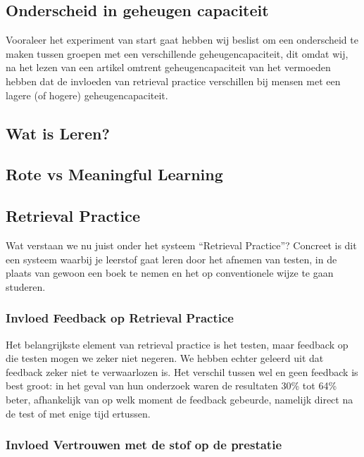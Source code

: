 \documentclass[12pt,a4paper]{article}
\begin{document}
        \subsection{Onderscheid in geheugen capaciteit}
        \label{geheugencapaciteit}
        Vooraleer het experiment van start gaat hebben wij beslist om een onderscheid te maken tussen groepen met een verschillende geheugencapaciteit, dit omdat wij, na het lezen van een artikel omtrent geheugencapaciteit van \cite{Agarwal2016} het vermoeden hebben dat de invloeden van retrieval practice verschillen bij mensen met een lagere (of hogere) geheugencapaciteit.
                
        \subsection{Wat is Leren?}
        
        \subsection{Rote vs Meaningful Learning}
        \label{RoteVSMeaningful}
        
        \subsection{Retrieval Practice}
        
        Wat verstaan we nu juist onder het systeem ``Retrieval Practice''? Concreet is dit een systeem waarbij je leerstof gaat leren door het afnemen van testen, in de plaats van gewoon een boek te nemen en het op conventionele wijze te gaan studeren.
        
            \subsubsection{Invloed Feedback op Retrieval Practice}
            
            Het belangrijkste element van retrieval practice is het testen, maar feedback op die testen mogen we zeker niet negeren. We hebben echter geleerd uit \cite{HenryRoediger2011} dat feedback zeker niet te verwaarlozen is. Het verschil tussen wel en geen feedback is best groot: in het geval van hun onderzoek waren de resultaten 30\% tot 64\% beter, afhankelijk van op welk moment de feedback gebeurde, namelijk direct na de test of met enige tijd ertussen. 
    
            \subsubsection{Invloed Vertrouwen met de stof op de prestatie}
            
\end{document}
